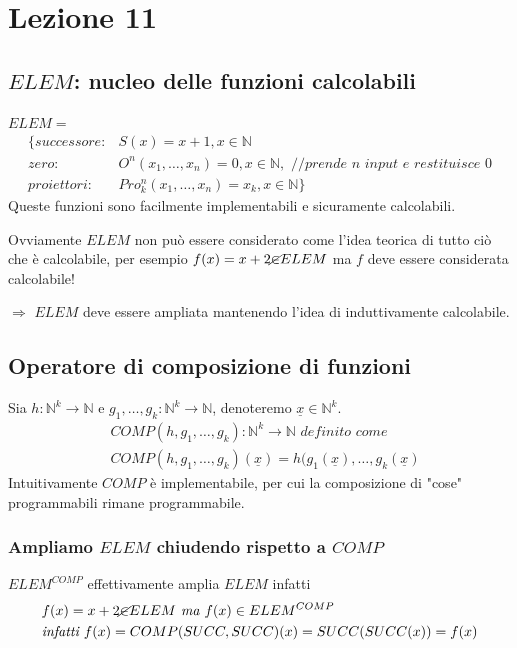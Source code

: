 \documentclass{article}
\begin{document}
\section{Lezione 11}

\subsection{$ELEM$: nucleo delle funzioni calcolabili}
$ELEM=$
\begin{displaymath}
\begin{split}
	\{ successore:&S(x)=x+1, x \in \mathbb{N} \\
	zero:&O^n(x_1,\dots, x_n)=0, x \in \mathbb{N}, \textit{ //prende $n$ input e restituisce 0} \\
	proiettori:&Pro^n_k(x_1,\dots, x_n)=x_k, x \in \mathbb{N} \}\end{split}
\end{displaymath}
Queste funzioni sono facilmente implementabili e sicuramente calcolabili.



Ovviamente $ELEM$ non può essere considerato come l'idea teorica di tutto ciò che è calcolabile, per esempio $f(x)=x+2 \cancel{\in} ELEM$ ma $f$ deve essere considerata calcolabile!



$\Rightarrow$ $ELEM$ deve essere ampliata mantenendo l'idea di induttivamente calcolabile.

\subsection{Operatore di composizione di funzioni}
Sia $h:\mathbb{N}^k \rightarrow \mathbb{N}$ e $g_1, \dots, g_k: \mathbb{N}^k \rightarrow \mathbb{N}$, denoteremo $\underline{x} \in \mathbb{N}^k$.
\begin{displaymath}
	\begin{split}
		&COMP(h, g_1, \dots, g_k): \mathbb{N}^k \rightarrow \mathbb{N} \textit{ definito come } \\
		& COMP(h, g_1, \dots, g_k)(\underline{x})=h(g_1(\underline{x}), \dots, g_k(\underline{x})
	\end{split}
\end{displaymath}
Intuitivamente $COMP$ è implementabile, per cui la composizione di "cose" programmabili rimane programmabile.

\subsubsection{Ampliamo $ELEM$ chiudendo rispetto a $COMP$}
$ELEM^{COMP}$ effettivamente amplia $ELEM$ infatti
\begin{displaymath}
	\begin{split}
		&f(x)=x+2 \cancel{\in} ELEM \textit{ ma } f(x) \in ELEM^{COMP} \\
		& \textit{infatti } f(x)=COMP(SUCC,SUCC)(x)=SUCC(SUCC(x)) = f(x)
	\end{split}
\end{displaymath}
\end{document}

